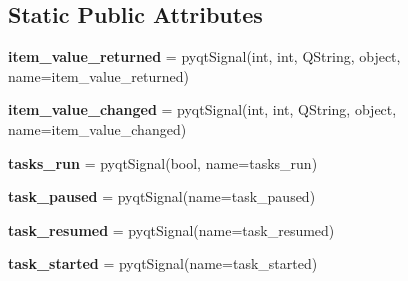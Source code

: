 \subsection*{Static Public Attributes}
\begin{DoxyCompactItemize}
\item 
{\bfseries item\+\_\+value\+\_\+returned} = pyqt\+Signal(int, int, \textquotesingle{}Q\+String\textquotesingle{}, object, name=\textquotesingle{}item\+\_\+value\+\_\+returned\textquotesingle{})\hypertarget{classplume-creator_1_1src_1_1plume_1_1data_1_1signal__hub_1_1_signal_hub_adbfa9ea543f04230d8cf157d2077c094}{}\label{classplume-creator_1_1src_1_1plume_1_1data_1_1signal__hub_1_1_signal_hub_adbfa9ea543f04230d8cf157d2077c094}

\item 
{\bfseries item\+\_\+value\+\_\+changed} = pyqt\+Signal(int, int, \textquotesingle{}Q\+String\textquotesingle{}, object, name=\textquotesingle{}item\+\_\+value\+\_\+changed\textquotesingle{})\hypertarget{classplume-creator_1_1src_1_1plume_1_1data_1_1signal__hub_1_1_signal_hub_a6326905ef3e589295388de3fe47f676d}{}\label{classplume-creator_1_1src_1_1plume_1_1data_1_1signal__hub_1_1_signal_hub_a6326905ef3e589295388de3fe47f676d}

\item 
{\bfseries tasks\+\_\+run} = pyqt\+Signal(bool, name=\textquotesingle{}tasks\+\_\+run\textquotesingle{})\hypertarget{classplume-creator_1_1src_1_1plume_1_1data_1_1signal__hub_1_1_signal_hub_a5f2f378c7aab3982080b24c26bbde108}{}\label{classplume-creator_1_1src_1_1plume_1_1data_1_1signal__hub_1_1_signal_hub_a5f2f378c7aab3982080b24c26bbde108}

\item 
{\bfseries task\+\_\+paused} = pyqt\+Signal(name=\textquotesingle{}task\+\_\+paused\textquotesingle{})\hypertarget{classplume-creator_1_1src_1_1plume_1_1data_1_1signal__hub_1_1_signal_hub_a58c007e378baef8878c28c8bc284c62d}{}\label{classplume-creator_1_1src_1_1plume_1_1data_1_1signal__hub_1_1_signal_hub_a58c007e378baef8878c28c8bc284c62d}

\item 
{\bfseries task\+\_\+resumed} = pyqt\+Signal(name=\textquotesingle{}task\+\_\+resumed\textquotesingle{})\hypertarget{classplume-creator_1_1src_1_1plume_1_1data_1_1signal__hub_1_1_signal_hub_a9d68bc4cca26a6d513b0aa3fa43b7a2d}{}\label{classplume-creator_1_1src_1_1plume_1_1data_1_1signal__hub_1_1_signal_hub_a9d68bc4cca26a6d513b0aa3fa43b7a2d}

\item 
{\bfseries task\+\_\+started} = pyqt\+Signal(name=\textquotesingle{}task\+\_\+started\textquotesingle{})\hypertarget{classplume-creator_1_1src_1_1plume_1_1data_1_1signal__hub_1_1_signal_hub_a5317f29ea145c911d4ba4638f613f6e8}{}\label{classplume-creator_1_1src_1_1plume_1_1data_1_1signal__hub_1_1_signal_hub_a5317f29ea145c911d4ba4638f613f6e8}


\end{DoxyCompactItemize}
